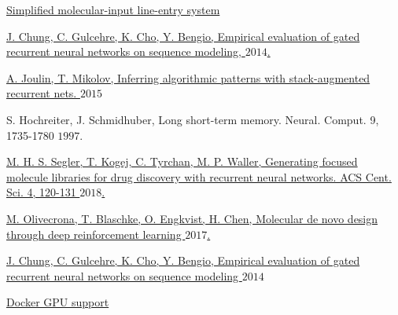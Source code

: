 \documentclass[a4paper]{article}
\begin{document}
\begin{thebibliography}{1}

\href{https://en.wikipedia.org/wiki/Simplified_molecular-input_line-entry_system/}{Simplified molecular-input line-entry system}

\href{http://arxiv.org/abs/1412.3555/}{J. Chung, C. Gulcehre, K. Cho, Y. Bengio, Empirical evaluation of gated recurrent neural networks on sequence modeling, \(2014\).}

\href{http://arxiv.org/abs/1503.01007}{A. Joulin, T. Mikolov, Inferring algorithmic patterns with stack-augmented recurrent nets. \(2015\)}

{S. Hochreiter, J. Schmidhuber, Long short-term memory. Neural. Comput. 9, 1735-1780 \(1997\).}

\href{https://pubs.acs.org/doi/10.1021/acscentsci.7b00512}{M. H. S. Segler, T. Kogej, C. Tyrchan, M. P. Waller, Generating focused molecule libraries for drug discovery with recurrent neural networks. ACS Cent. Sci. 4, 120-131 \(2018\).}

\href{http://arxiv.org/abs/1704.07555}{M. Olivecrona, T. Blaschke, O. Engkvist, H. Chen, Molecular de novo design through deep reinforcement learning \(2017\).}

\href{http://arxiv.org/abs/1412.3555}{J. Chung, C. Gulcehre, K. Cho, Y. Bengio, Empirical evaluation of gated recurrent neural networks on sequence modeling \(2014\)}

\href{https://docs.docker.com/compose/gpu-support/}{Docker GPU support}

\end{thebibliography}
\end{document}

